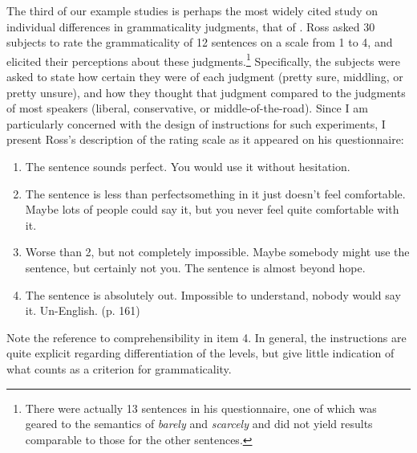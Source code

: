 The third of our example studies is perhaps the most widely cited study on individual differences in grammaticality judgments, that of \citet{Ross1979}. Ross asked 30 subjects to rate the grammaticality of 12 sentences on a scale from 1 to 4, and elicited their perceptions about these judgments.\footnote{There were actually 13 sentences in his questionnaire, one of which was geared to the semantics of \textit{barely} and \textit{scarcely} and did not yield results comparable to those for the other sentences.}
 Specifically, the subjects were asked to state how certain they were of each judgment (pretty sure, middling, or pretty unsure), and how they thought that judgment compared to the judgments of most speakers (liberal, conservative, or middle-of-the-road). Since I am particularly concerned with the design of instructions for such experiments, I present Ross's description of the rating scale as it appeared on his questionnaire:

\begin{enumerate}
\item  The sentence sounds perfect. You would use it without hesitation.
\item   The sentence is less than perfect\schdash{}something in it just doesn't feel comfortable. Maybe lots of people could say it, but you
 never feel quite comfortable with it.
\item  Worse than 2, but not completely impossible. Maybe somebody might use the sentence, but certainly not you. The sentence is almost beyond hope.
\item  The sentence is absolutely out. Impossible to understand, nobody would say it. Un-English. (p. 161)
\end{enumerate}

\noindent
Note the reference to comprehensibility in item 4. In general, the instructions are quite explicit regarding differentiation of the levels, but give little indication of what counts as a criterion for grammaticality.

